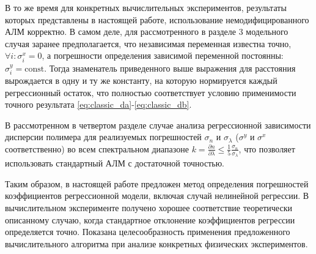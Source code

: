 \documentclass[11pt,a4paper]{article}
\theoremstyle{definition}
\begin{document}
\begin{enumerate}
	В то же время для конкретных вычислительных экспериментов, результаты которых
	представлены в настоящей работе, использование немодифицированного АЛМ корректно.
	В самом деле, для рассмотренного в разделе 3 модельного случая заранее
	предполагается, что независимая переменная известна точно,
	$\forall i : \sigma^x_i = 0$, а погрешности определения зависимой переменной
	постоянны: $\sigma^y_i = \text{const}$. Тогда знаменатель приведенного выше выражения
	для расстояния вырождается в одну и ту же константу, на которую нормируется каждый
	регрессионный остаток, что полностью соответствует условию применимости
	точного результата \eqref{eq:classic_da}-\eqref{eq:classic_db}.

	В рассмотренном в четвертом разделе случае анализа регрессионной
	зависимости дисперсии полимера для реализуемых погрешностей
	$\sigma_n$ и $\sigma_{\lambda}$ ($\sigma^y$ и $\sigma^x$ соответственно)
	во всем спектральном диапазоне
	$k = \frac{\partial n}{\partial \lambda} \leq \frac{1}{5} \frac{\sigma_n}{\sigma_{\lambda}}$,
	что позволяет использовать стандартный АЛМ с достаточной точностью.
\end{enumerate}

Таким образом, в настоящей работе предложен метод определения
погрешностей коэффициентов регрессионной модели, включая случай нелинейной регрессии. В
вычислительном эксперименте получено хорошее соответствие теоретически описанному случаю, когда
стандартное отклонение коэффициентов регрессии определяется точно.
Показана целесообразность применения предложенного вычислительного
алгоритма при анализе конкретных физических экспериментов.

\FloatBarrier


%
%

\end{document}
